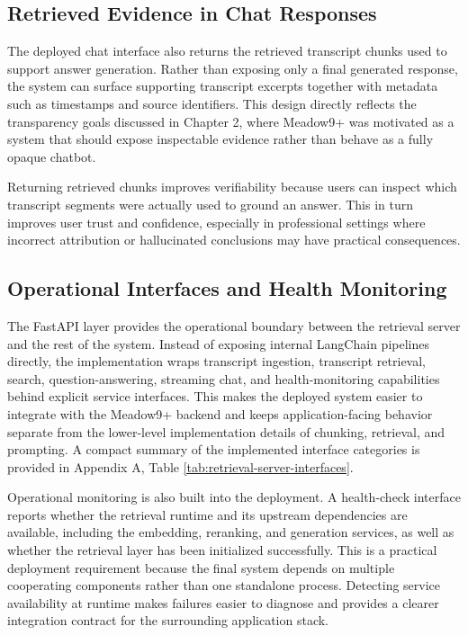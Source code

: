 \subsection{Retrieved Evidence in Chat Responses}
The deployed chat interface also returns the retrieved transcript chunks used to support answer generation. Rather than exposing only a final generated response, the system can surface supporting transcript excerpts together with metadata such as timestamps and source identifiers. This design directly reflects the transparency goals discussed in Chapter 2, where Meadow9+ was motivated as a system that should expose inspectable evidence rather than behave as a fully opaque chatbot.

Returning retrieved chunks improves verifiability because users can inspect which transcript segments were actually used to ground an answer. This in turn improves user trust and confidence, especially in professional settings where incorrect attribution or hallucinated conclusions may have practical consequences.

\subsection{Operational Interfaces and Health Monitoring}
The FastAPI layer provides the operational boundary between the retrieval server and the rest of the system. Instead of exposing internal LangChain pipelines directly, the implementation wraps transcript ingestion, transcript retrieval, search, question-answering, streaming chat, and health-monitoring capabilities behind explicit service interfaces. This makes the deployed system easier to integrate with the Meadow9+ backend and keeps application-facing behavior separate from the lower-level implementation details of chunking, retrieval, and prompting.\cite{fastapi_docs,pydantic_docs} A compact summary of the implemented interface categories is provided in Appendix A, Table \ref{tab:retrieval-server-interfaces}.

Operational monitoring is also built into the deployment. A health-check interface reports whether the retrieval runtime and its upstream dependencies are available, including the embedding, reranking, and generation services, as well as whether the retrieval layer has been initialized successfully. This is a practical deployment requirement because the final system depends on multiple cooperating components rather than one standalone process. Detecting service availability at runtime makes failures easier to diagnose and provides a clearer integration contract for the surrounding application stack.

